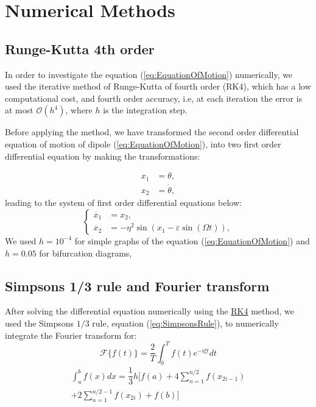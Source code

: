 \section{Numerical Methods}

\subsection{Runge-Kutta 4th order}
\label{sec:RK4}
In order to investigate the equation (\ref{eq:EquationOfMotion}) numerically, we used the iterative method of Runge-Kutta of fourth order (RK4), which has a low computational cost, and fourth order accuracy, i.e, at each iteration the error is at most $\mathcal{O}(h^4)$, where $h$ is the integration step.

Before applying the method, we have transformed the second order differential equation of motion of dipole (\ref{eq:EquationOfMotion}), into two first order differential equation by making the transformations:

\begin{equation}
    \begin{aligned}
        x_1 &= \theta,\\
        x_2 &= \dot{\theta}, 
    \end{aligned}
\end{equation}
leading to the system of first order differential equations below:
\begin{equation}
    \begin{cases}
        \dot{x_1} &= x_2,\\
        \dot{x_2} &= -\eta^2 \sin(x_1 - \varepsilon \sin(\Omega t)),
    \end{cases}
\end{equation}
We used $h=10^{-4}$ for simple graphs of the equation (\ref{eq:EquationOfMotion}) and $h = 0.05$ for bifurcation diagrams,
\subsection{Simpson\textquotesingle s 1/3 rule and Fourier transform}
After solving the differential equation numerically using the \hyperref[sec:RK4]{RK4} method, we used the Simpson\textquotesingle s $1/3$ rule, equation (\ref{eq:SimpsonsRule}), to numerically integrate the Fourier transform for: 
\begin{equation}
    \mathcal{F}\{f(t)\}= \dfrac{2}{T}\int_{0}^{T} f(t) e^{- i \xi t}dt
\end{equation}
    \begin{multline}
        \int_{a}^{b} f(x) dx = \dfrac{1}{3} h\bigg[ f(a) + 
         4\sum^{n/2}_{n=1}f(x_{2i-1}) \\
         + 2 \sum^{n/2 - 1}_{n=1}f(x_{2i})+f(b) \bigg]        
    \label{eq:SimpsonsRule}
\end{multline}
